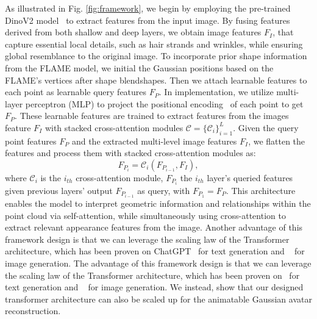 As illustrated in Fig. \ref{fig:framework}, we begin by employing the pre-trained DinoV2 model~\cite{DinoV2} to extract features from the input image. By fusing features derived from both shallow and deep layers, we obtain image features $F_{I}$, that capture essential local details, such as hair strands and wrinkles, while ensuring global resemblance to the original image. To incorporate prior shape information from the FLAME model, we initial the Gaussian positions based on the FLAME's vertices after shape blendshapes. Then we attach learnable features to each point as learnable query features $F_{P}$. In implementation, we utilize multi-layer perceptron (MLP) to project the positional encoding~\cite{NeRF} of each point to get $F_{P}$. These learnable features are trained to extract features from the images feature $F_I$ with stacked cross-attention modules $\mathcal{C} = \{\mathcal{C}_i\}^{L}_{i=1}$. Given the query point features $F_{P}$ and the extracted multi-level image features $F_{I}$, we flatten the features and process them with stacked cross-attention modules as:
\begin{equation}
    F_{P_{i}} = \mathcal{C}_{i}(F_{P_{i-1}}, F_I),
\end{equation}
where $\mathcal{C}_i$ is the $i_{th}$ cross-attention module, $F_{P_{i}}$ the $i_{th}$ layer's queried features given previous layers' output $F_{P_{i-1}}$ as query, with $F_{P_{1}} = F_P$.
This architecture enables the model to interpret geometric information and relationships within the point cloud via self-attention, while simultaneously using cross-attention to extract relevant appearance features from the image. Another advantage of this framework design is that we can leverage the scaling law of the Transformer architecture, which has been proven on ChatGPT~\cite{} for text generation and ~\cite{ScalableDiffusionModelsWTransformers} for image generation. 
The advantage of this framework design is that we can leverage the scaling law of the Transformer architecture, which has been proven on~\cite{LLAMA} for text generation and ~\cite{ScalableDiffusionModelsWTransformers} for image generation. We instead, show that our designed transformer architecture can also be scaled up for the animatable Gaussian avatar reconstruction.

